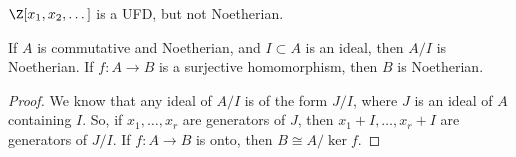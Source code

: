 \begin{ex}
    $\Z[x_1,x_2,\dots]$ is a UFD, but not Noetherian.
\end{ex}

\begin{prop}
    If $A$ is commutative and Noetherian, and $I \subset A$ is an ideal, then $A/I$ is Noetherian. If $f : A \to B$ is a surjective homomorphism, then $B$ is Noetherian.
\end{prop}

\begin{proof}
    We know that any ideal of $A/I$ is of the form $J/I$, where $J$ is an ideal of $A$ containing $I$. So, if $x_1,\dots,x_r$ are generators of $J$, then $x_1+I,\dots,x_r+I$ are generators of $J/I$. If $f:A \to B$ is onto, then $B \cong A/ \ker f$.
\end{proof}

